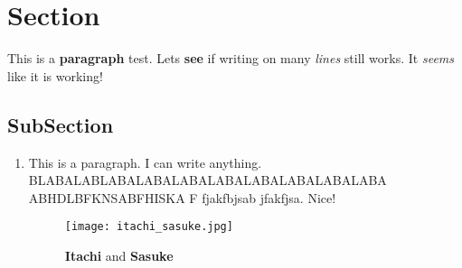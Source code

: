 \documentclass[12pt]{article}
\begin{document}
	\section*{Section}

		This is a \textbf{paragraph} test. Lets \textbf{see} if writing on many \textit{lines} still works. It \textit{seems} like it is working!

		\subsection{SubSection}

			\begin{enumerate}

				\item
				This is a paragraph. I can write anything. BLABALABLABALABALABALABALABALABALABALABA ABHDLBFKNSABFHISKA F fjakfbjsab jfakfjsa. Nice!

				\begin{figure}[H]
					\centering
					\texttt{[image: itachi\_sasuke.jpg]}
					\caption{\textbf{Itachi} and \textbf{Sasuke}}
				\end{figure}

			\end{enumerate}
\end{document}
